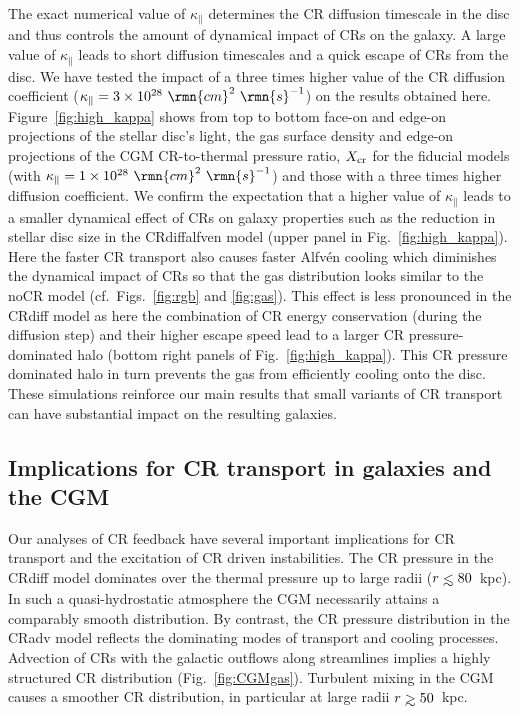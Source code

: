 \documentclass[useAMS,usenatbib]{mnras}
\def\lesssim{\mathrel{\hbox{\rlap{\hbox{\lower4pt\hbox{$\sim$}}}\hbox{$<$}}}}
\def\gtrsim{\mathrel{\hbox{\rlap{\hbox{\lower4pt\hbox{$\sim$}}}\hbox{$>$}}}}
\begin{document}
The exact numerical value of $\kappa_\parallel$ determines the CR diffusion timescale in the disc and thus controls the amount of dynamical impact of CRs on the galaxy. A large value of $\kappa_\parallel$ leads to short diffusion timescales and a quick escape of CRs from the disc. We have tested the impact of a three times higher value of the CR diffusion coefficient ($\kappa_\parallel=3\times10^{28}~\rmn{cm}^2~\rmn{s}^{-1}$) on the results obtained here. Figure~\ref{fig:high_kappa} shows from top to bottom face-on and edge-on projections of the stellar disc's light, the gas surface density and edge-on projections of the CGM CR-to-thermal pressure ratio, $X_{\rm cr}$ for the fiducial models (with $\kappa_\parallel=1\times10^{28}~\rmn{cm}^2~\rmn{s}^{-1}$) and those with a three times higher diffusion coefficient. We confirm the expectation that a higher value of $\kappa_\parallel$ leads to a smaller dynamical effect of CRs on galaxy properties such as the reduction in stellar disc size in the CRdiffalfven model (upper panel in Fig.~\ref{fig:high_kappa}). Here the faster CR transport also causes faster Alfv\'en cooling which diminishes the dynamical impact of CRs so that the gas distribution looks similar to the noCR model (cf.\ Figs.~\ref{fig:rgb} and \ref{fig:gas}). This effect is less pronounced in the CRdiff model as here the combination of CR energy conservation (during the diffusion step) and their higher escape speed lead to a larger CR pressure-dominated halo (bottom right panels of Fig.~\ref{fig:high_kappa}). This CR pressure dominated halo in turn prevents the gas from efficiently cooling onto the disc. These simulations reinforce our main results that small variants of CR transport can have substantial impact on the resulting galaxies.

\subsection{Implications for CR transport in galaxies and the CGM}
\label{subsec:dis}

Our analyses of CR feedback have several important implications for CR transport and the excitation of CR driven instabilities. The CR pressure in the CRdiff model dominates over the thermal pressure up to large radii ($r\lesssim80$~kpc). In such a quasi-hydrostatic atmosphere the CGM necessarily attains a comparably smooth distribution. By contrast, the CR pressure distribution in the CRadv model reflects the dominating modes of transport and cooling processes. Advection of CRs with the galactic outflows along streamlines implies a highly structured CR distribution (Fig.~\ref{fig:CGMgas}). Turbulent mixing in the CGM \citep{Pakmor2019} causes a smoother CR distribution, in particular at large radii $r\gtrsim50$~kpc. 
\end{document}
